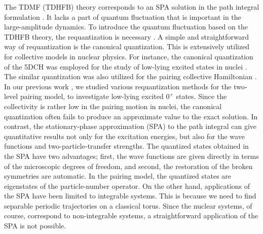 \documentclass[%
superscriptaddress,
showpacs,
nofootinbib,
amsmath,amssymb,
aps,
prc,
twocolumn,
floatfix ]%
{revtex4-1}
\begin{document}
The TDMF (TDHFB) theory corresponds to an SPA solution in the path integral
formulation \cite{Neg82}.
It lacks a part of quantum fluctuation that is
important in the large-amplitude dynamics.
To introduce the quantum fluctuation based on the TDHFB theory,
the requantization is necessary \cite{Neg82,L80,LNP80,Rei80,KS80,K81}.
A simple and straightforward way of requantization is
the canonical quantization.
This is extensively utilized for collective models in nuclear physics.
For instance,
the canonical quantization of the 5DCH was employed for the study of low-lying
excited states in nuclei \cite{PR09,HSNMM10,NMMY16}.
The similar quantization was also utilized for the pairing collective
Hamiltonian \cite{BBPK70, GPBW85, ZPPRS99, P07}.
In our previous work \cite{NN18},
we studied various requantization methods for the two-level pairing model,
to investigate low-lying excited $0^+$ states.
Since the collectivity is rather low in the pairing motion in nuclei,
the canonical quantization often fails to produce an approximate value %
to the exact solution.
In contrast,
the stationary-phase approximation (SPA) to the path integral \cite{SM88} 
can give quantitative results not only for the excitation energies, 
but also for the wave functions and two-particle-transfer strengths.
The quantized states obtained in the SPA have two advantages;
first, the wave functions are given directly in terms of
the microscopic degrees of freedom, and second,
the restoration of the broken symmetries are automatic.
In the pairing model, the quantized states are eigenstates of the particle-number
operator.
On the other hand, applications of the SPA have been limited to
integrable systems.
This is because we need to find separable periodic trajectories on a classical
torus.
Since the nuclear systems, of course, correspond to non-integrable systems,
a straightforward application of the SPA is not possible.
\end{document}
